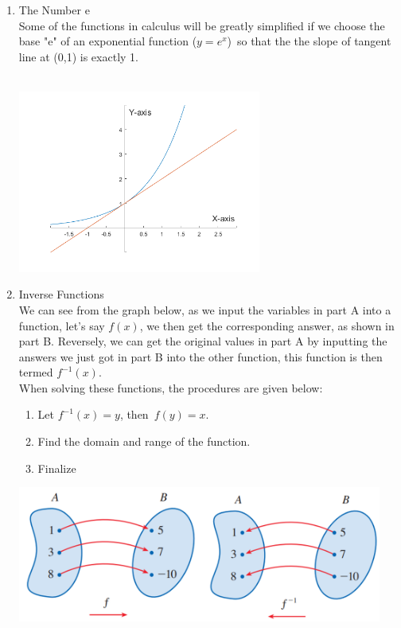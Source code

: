 \documentclass[12px]{article}
\begin{document}
\begin{enumerate}
    \item The Number e\\
    Some of the functions in calculus will be greatly simplified if we choose the base "e" of an exponential function ($y=e^x$)\ so that the the slope of tangent line at (0,1) is exactly 1. \\
    \\
    \begin{center}
        \includegraphics[width=8cm]{euler number graph.png}\\
    \end{center}

    \item Inverse Functions\\
    \hspace*{2em} We can see from the graph below, as we input the variables in part A into a function, let’s say $f(x)$, we then get the corresponding answer, as shown in part B. Reversely, we can get the original values in part A by inputting the answers we just got in part B into the other function, this function is then termed $f^{-1}(x)$.\\
    \hspace*{2em} When solving these functions, the procedures are given below:
    \begin{enumerate}[(1).]
        \item Let $f^{-1}(x)=y$, then\ $f(y)=x$.
        \item Find the domain and range of the function.
        \item Finalize
    \end{enumerate}
    \begin{center}
        \includegraphics*[width=12cm]{Projection of the function.png}
    \end{center}


\end{enumerate}
\end{document}

